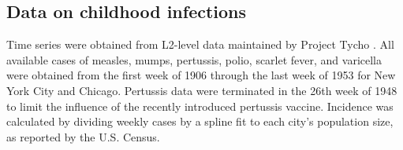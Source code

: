 \subsection*{Data on childhood infections}
Time series were obtained from L2-level data maintained by Project Tycho \cite{vanPanhuis2013}.
All available cases of measles, mumps, pertussis, polio, scarlet fever, and varicella were obtained from the first week of 1906 through the last week of 1953 for New York City and Chicago.
Pertussis data were terminated in the 26th week of 1948 to limit the influence of the recently introduced pertussis vaccine.
Incidence was calculated by dividing weekly cases by a spline fit to each city's population size, as reported by the U.S. Census.
